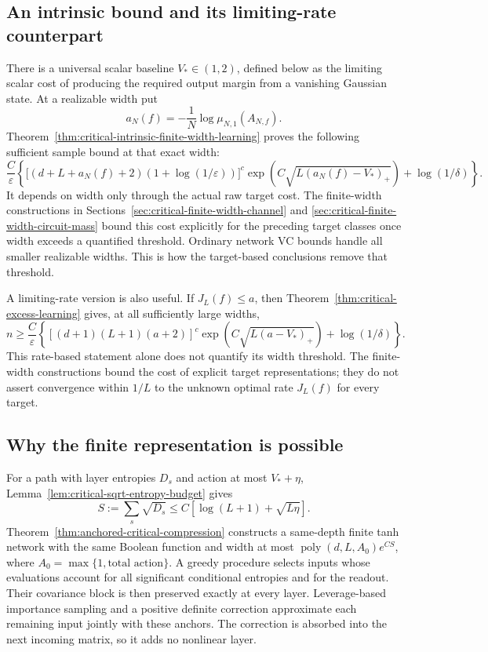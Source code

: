 \documentclass[11pt]{article}
\begin{document}
\subsection{An intrinsic bound and its limiting-rate counterpart}

There is a universal scalar baseline $V_*\in(1,2)$, defined below
as the limiting scalar cost of producing the required output margin
from a vanishing Gaussian state. At a realizable width put
\[
 a_N(f)=-\frac1N\log\mu_{N,1}(A_{N,f}).
\]
Theorem~\ref{thm:critical-intrinsic-finite-width-learning} proves the
following sufficient sample bound at that exact width:
\[
 \frac C\varepsilon\left\{
 \big[(d+L+a_N(f)+2)(1+\log(1/\varepsilon))\big]^c
 \exp\!\left(C\sqrt{L(a_N(f)-V_*)_+}\right)
 +\log(1/\delta)\right\}.
\]
It depends on width only through the actual raw target cost.
The finite-width constructions in
Sections~\ref{sec:critical-finite-width-channel} and
\ref{sec:critical-finite-width-circuit-mass} bound this cost explicitly
for the preceding target classes once width exceeds a quantified
threshold. Ordinary network VC bounds handle all smaller realizable
widths. This is how the target-based conclusions remove that threshold.

A limiting-rate version is also useful. If $J_L(f)\le a$, then
Theorem~\ref{thm:critical-excess-learning} gives, at all sufficiently
large widths,
\[
 n\ge\frac C\varepsilon\left\{
 [(d+1)(L+1)(a+2)]^c
 \exp\!\left(C\sqrt{L(a-V_*)_+}\right)+\log(1/\delta)\right\}.
\]
This rate-based statement alone does not quantify its width threshold.
The finite-width constructions bound the cost of explicit target
representations; they do not assert convergence within $1/L$ to the
unknown optimal rate $J_L(f)$ for every target.

\subsection{Why the finite representation is possible}

For a path with layer entropies $D_s$ and action at most
$V_*+\eta$, Lemma~\ref{lem:critical-sqrt-entropy-budget} gives
\[
 S:=\sum_s\sqrt{D_s}
 \le C[\log(L+1)+\sqrt{L\eta}].
\]
Theorem~\ref{thm:anchored-critical-compression} constructs a
same-depth finite tanh network with the same Boolean function and
width at most $\operatorname{poly}(d,L,A_0)e^{CS}$, where
$A_0=\max\{1,\text{total action}\}$.
A greedy procedure selects inputs whose evaluations account for
all significant conditional entropies and for the readout. Their
covariance block is then preserved exactly at every layer.
Leverage-based importance sampling and a positive definite correction
approximate each remaining input jointly with these anchors.
The correction is absorbed into the next incoming matrix, so it
adds no nonlinear layer.
\end{document}
